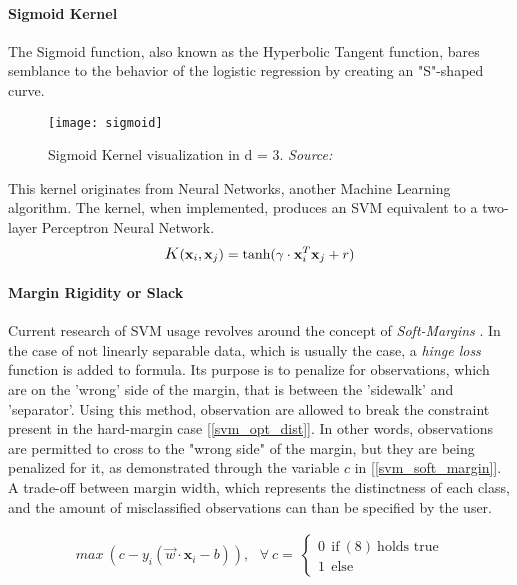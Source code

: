 \paragraph{Sigmoid Kernel}
	The Sigmoid function, also known as the Hyperbolic Tangent function, bares semblance to the behavior of the logistic regression by creating an "S"-shaped curve. 
	
	\begin{figure}[h]
		\centering
		\captionsetup{width=0.8\textwidth}
		\texttt{[image: sigmoid]}
		\caption[Sigmoid Kernel]{
			\footnotesize{
				Sigmoid Kernel visualization in d = 3. \textit{Source:} \cite{carrington2014new}
			}
		}
	\end{figure}
	
	This kernel originates from Neural Networks, another Machine Learning algorithm. The kernel, when implemented, produces an SVM equivalent to a two-layer Perceptron Neural Network.
	\begin{equation}
		\mathlarger{K}(\textbf{x}_i,\textbf{x}_j) = \text{tanh}(\gamma \cdot \textbf{x}^T_i \textbf{x}_j + r)
	\end{equation}
	


\paragraph{Margin Rigidity or Slack}
	Current research of SVM usage revolves around the concept of \textit{Soft-Margins} \cite{SVM_cortes1995support}. In the case of not linearly separable data, which is usually the case, a \textit{hinge loss} function is added to formula. Its purpose is to penalize for observations, which are on the 'wrong' side of the margin, that is between the 'sidewalk' and 'separator'. Using this method, observation are allowed to break the constraint present in the hard-margin case [\ref{svm_opt_dist}]. In other words, observations are permitted to cross to the "wrong side" of the margin, but they are being penalized for it, as demonstrated through the variable $c$ in [\ref{svm_soft_margin}]. A trade-off between margin width, which represents the distinctness of each class, and the amount of misclassified observations can than be specified by the user.

	\begin{equation}
		\begin{aligned}
			max \ (c - y_i(\vec{w} \cdot \textbf{x}_i - b)), 
			\  \ \ \forall \ c = \ 
			\begin{cases} 
				0 \ \ \text{if} \ (8) \ \text{holds true}\\
				1 \ \ \text{else}
			\end{cases}
		\end{aligned}
		\label{svm_soft_margin}
	\end{equation}

